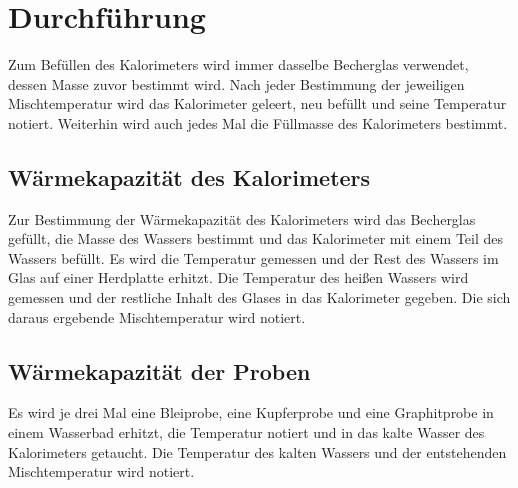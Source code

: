 
\section{Durchführung}
\label{sec:Durchführung}

Zum Befüllen des Kalorimeters wird immer dasselbe Becherglas verwendet, dessen Masse zuvor bestimmt wird. Nach jeder Bestimmung der jeweiligen Mischtemperatur wird das Kalorimeter geleert, neu befüllt und seine Temperatur notiert. Weiterhin wird auch jedes Mal die Füllmasse des Kalorimeters bestimmt.
\subsection{Wärmekapazität des Kalorimeters}
Zur Bestimmung der Wärmekapazität des Kalorimeters wird das Becherglas gefüllt, die Masse des Wassers bestimmt und das Kalorimeter mit einem Teil des Wassers befüllt. Es wird die Temperatur gemessen und der Rest des Wassers im Glas auf einer Herdplatte erhitzt. Die Temperatur des heißen Wassers wird gemessen und der restliche Inhalt des Glases in das Kalorimeter gegeben. Die sich daraus ergebende Mischtemperatur wird notiert.
\subsection{Wärmekapazität der Proben}
Es wird je drei Mal eine Bleiprobe, eine Kupferprobe und eine Graphitprobe in einem Wasserbad erhitzt, die Temperatur notiert und in das kalte Wasser des Kalorimeters getaucht. Die Temperatur des kalten Wassers und der entstehenden Mischtemperatur wird notiert.
